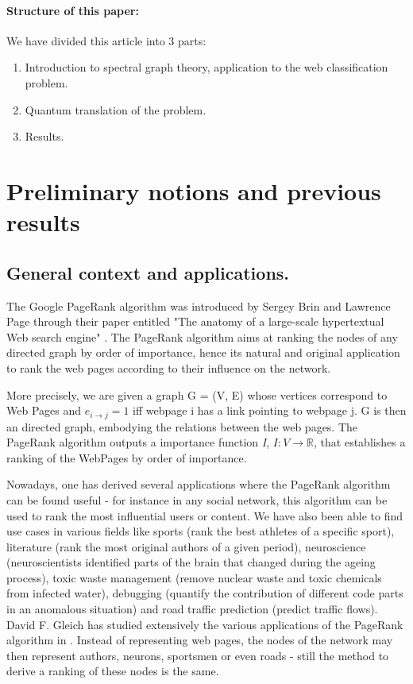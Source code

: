 \documentclass{article}
\begin{document}
\paragraph{Structure of this paper:}
We have divided this article into 3 parts:
\begin{enumerate}
    \item Introduction to spectral graph theory, application to the web classification problem.
    \item Quantum translation of the problem.
    \item Results.
\end{enumerate}

\newpage

\tableofcontents

\newpage


\section{Preliminary notions and previous results}
\label{sec:previousResults}

\subsection{General context and applications.}
The Google PageRank algorithm was introduced by Sergey Brin and Lawrence Page through their paper entitled "The anatomy of a large-scale hypertextual Web search engine" \cite{brin_page_1998}. The PageRank algorithm aims at ranking the nodes of any directed graph by order of importance, hence its natural and original application to rank the web pages according to their influence on the network.

More precisely, we are given a graph G = (V, E) whose vertices correspond to Web Pages and $e_{i \rightarrow j} = 1$ iff webpage i has a link pointing to webpage j. G is then an directed graph, embodying the relations between the web pages. The PageRank algorithm outputs a importance function \emph{I}, $I:V \rightarrow \mathbb{R}$, that establishes a ranking of the WebPages by order of importance.

Nowadays, one has derived several applications where the PageRank algorithm can be found useful - for instance in any social network, this algorithm can be used to rank the most influential users or content. We have also been able \cite{cornell_pagerank} to find use cases in various fields like sports (rank the best athletes of a specific sport), literature (rank the most original authors of a given period), neuroscience (neuroscientists identified parts of the brain that changed during the ageing process), toxic waste management (remove nuclear waste and toxic chemicals from infected water), debugging (quantify the contribution of different code parts in an anomalous situation) and road traffic prediction (predict traffic flows). David F. Gleich has studied extensively the various applications of the PageRank algorithm in \cite{gleich_2015}. Instead of representing web pages, the nodes of the network may then represent authors, neurons, sportsmen or even roads - still the method to derive a ranking of these nodes is the same. 
\end{document}
